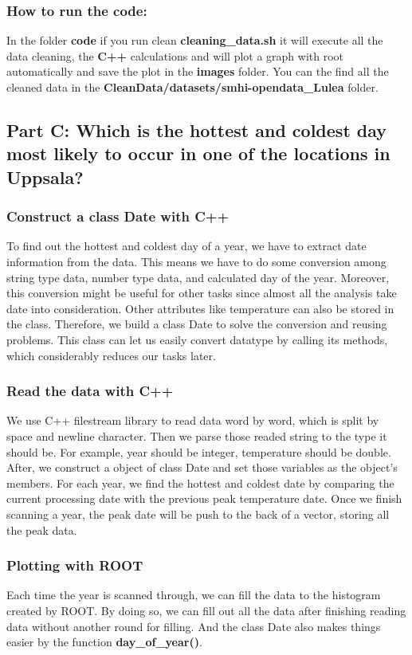 \documentclass[a4paper]{article}
\begin{document}
\subsubsection{How to run the code:}
In the folder \textbf{code} if you run clean \textbf{cleaning\_data.sh} it will execute all the data cleaning, the \textbf{C++} calculations and will plot a graph with root automatically and save the plot in the \textbf{images} folder. You can the find all the cleaned data in the \textbf{CleanData/datasets/smhi-opendata\_Lulea} folder.

\subsection{Part C: Which is the hottest and coldest day most likely to occur in one of the locations in Uppsala?}
\subsubsection{Construct a class Date with C++}
To find out the hottest and coldest day of a year, we have to extract date information from the data. This means we have to do some conversion among string type data, number type data, and calculated day of the year. Moreover, this conversion might be useful for other tasks since almost all the analysis take date into consideration. Other attributes like temperature can also be stored in the class. Therefore, we build a class Date to solve the conversion and reusing problems. This class can let us easily convert datatype by calling its methods, which considerably reduces our tasks later.
\subsubsection{Read the data with C++}
We use C++ filestream library to read data word by word, which is split by space and newline character. Then we parse those readed string to the type it should be. For example, year should be integer, temperature should be double. After, we construct a object of class Date and set those variables as the object's members. For each year, we find the hottest and coldest date by comparing the current processing date with the previous peak temperature date.
Once we finish scanning a year, the peak date will be push to the back of a vector, storing all the peak data.
\subsubsection{Plotting with ROOT}
Each time the year is scanned through, we can fill the data to the histogram created by ROOT. By doing so, we can fill out all the data after finishing reading data without another round for filling. And the class Date also makes things easier by the function \textbf{day\_of\_year()}. 
\end{document}
